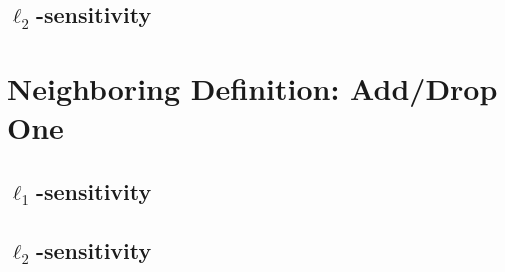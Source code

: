 \documentclass[11pt]{scrartcl} %
\begin{document}
%
%
%
%
%


\subsection{$\ell_2$-sensitivity}

\section{Neighboring Definition: Add/Drop One}
\subsection{$\ell_1$-sensitivity}

\subsection{$\ell_2$-sensitivity}



\end{document}
